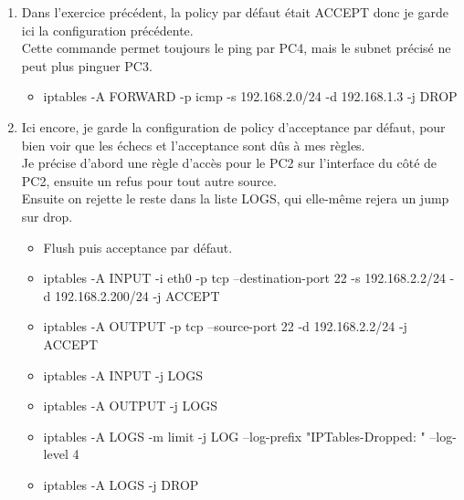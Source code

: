 \documentclass[a4paper,10pt,final,fleqn]{article}
\begin{document}
\begin{enumerate}
			\item Dans l'exercice précédent, la policy par défaut était ACCEPT donc je garde ici la configuration précédente.\\
			Cette commande permet toujours le ping par PC4, mais le subnet précisé ne peut plus pinguer PC3.\\

				\begin{itemize}
					\item iptables -A FORWARD -p icmp -s 192.168.2.0/24 -d 192.168.1.3 -j DROP
				\end{itemize}

			\item Ici encore, je garde la configuration de policy d'acceptance par défaut, pour bien voir que les échecs et l'acceptance sont dûs à mes règles.\\

			Je précise d'abord une règle d'accès pour le PC2 sur l'interface du côté de PC2, ensuite un refus pour tout autre source.\\
			Ensuite on rejette le reste dans la liste LOGS, qui elle-même rejera un jump sur drop.\\

				\begin{itemize}
					\item Flush puis acceptance par défaut.
					\item iptables -A INPUT -i eth0 -p tcp --destination-port 22 -s 192.168.2.2/24 -d 192.168.2.200/24 -j ACCEPT
					\item iptables -A OUTPUT -p tcp --source-port 22 -d 192.168.2.2/24 -j ACCEPT
					\item iptables -A INPUT -j LOGS
					\item iptables -A OUTPUT -j LOGS
					\item iptables -A LOGS -m limit -j LOG --log-prefix "IPTables-Dropped: " --log-level 4
					\item iptables -A LOGS -j DROP
				\end{itemize}
		\end{enumerate}
\end{document}
